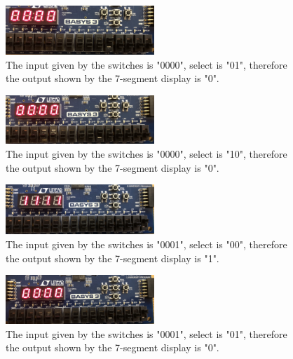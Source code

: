 \documentclass[11pt]{article}
\begin{document}
\begin{figure}[H]
\begin{center}
	\includegraphics[width=0.5\textwidth]{../report-images/Part2/IMG_3096.jpg}
	\caption{\label{fig:p2img2}The input given by the switches is "0000", select is "01", therefore the output shown by the 7-segment display is "0".}
\end{center}
\end{figure}

\begin{figure}[H]
\begin{center}
	\includegraphics[width=0.5\textwidth]{../report-images/Part2/IMG_3097.jpg}
	\caption{\label{fig:p2img3}The input given by the switches is "0000", select is "10", therefore the output shown by the 7-segment display is "0".}
\end{center}
\end{figure}

\begin{figure}[H]
\begin{center}
	\includegraphics[width=0.5\textwidth]{../report-images/Part2/IMG_3098.jpg}
	\caption{\label{fig:p2img4}The input given by the switches is "0001", select is "00", therefore the output shown by the 7-segment display is "1".}
\end{center}
\end{figure}

\begin{figure}[H]
\begin{center}
	\includegraphics[width=0.5\textwidth]{../report-images/Part2/IMG_3099.jpg}
	\caption{\label{fig:p2img5}The input given by the switches is "0001", select is "01", therefore the output shown by the 7-segment display is "0".}
\end{center}
\end{figure}
\end{document}
